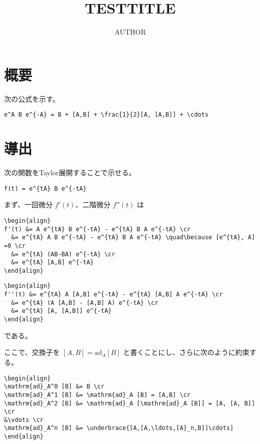 \documentclass[dvipdfmx]{jsarticle}
\begin{document}
\title{TESTTITLE}
\author{AUTHOR}
\maketitle

\hypertarget{ux6982ux8981}{%
\section{概要}\label{ux6982ux8981}}

次の公式を示す。

\begin{verbatim}
e^A B e^{-A} = B + [A,B] + \frac{1}{2}[A, [A,B]] + \cdots
\end{verbatim}

\hypertarget{ux5c0eux51fa}{%
\section{導出}\label{ux5c0eux51fa}}

次の関数をTaylor展開することで示せる。

\begin{verbatim}
f(t) = e^{tA} B e^{-tA}
\end{verbatim}

まず、一回微分 \(f'(t)\)、二階微分 \(f''(t)\) は

\begin{verbatim}
\begin{align}
f'(t) &= A e^{tA} B e^{-tA} - e^{tA} B A e^{-tA} \cr
  &= e^{tA} A B e^{-tA} - e^{tA} B A e^{-tA} \quad\because [e^{tA}, A] =0 \cr
  &= e^{tA} (AB-BA) e^{-tA} \cr
  &= e^{tA} [A,B] e^{-tA}
\end{align}
\end{verbatim}

\begin{verbatim}
\begin{align}
f''(t) &= e^{tA} A [A,B] e^{-tA} - e^{tA} [A,B] A e^{-tA} \cr
  &= e^{tA} (A [A,B] - [A,B] A) e^{-tA} \cr
  &= e^{tA} [A, [A,B]] e^{-tA}
\end{align}
\end{verbatim}

である。

ここで、交換子を \([A,B] = \mathrm{ad}_A [B]\)
と書くことにし、さらに次のように約束する。

\begin{verbatim}
\begin{align}
\mathrm{ad}_A^0 [B] &= B \cr
\mathrm{ad}_A^1 [B] &= \mathrm{ad}_A [B] = [A,B] \cr
\mathrm{ad}_A^2 [B] &= \mathrm{ad}_A [\mathrm{ad}_A [B]] = [A, [A, B]] \cr
&\vdots \cr
\mathrm{ad}_A^n [B] &= \underbrace{[A,[A,\ldots,[A}_n,B]]\cdots]
\end{align}
\end{verbatim}
\end{document}

